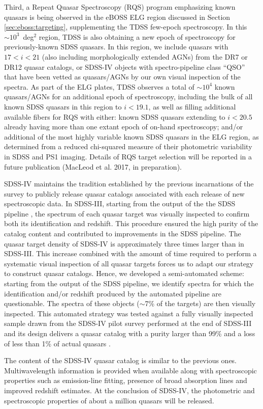 Third, a Repeat Quasar Spectroscopy (RQS) program emphasizing known
quasars is being observed in the eBOSS ELG region discussed in
Section \ref{sec:eboss:targeting}, supplementing the TDSS few-epoch
spectroscopy. In this $\sim10^3$~deg$^2$ region, TDSS is also
obtaining a new epoch of spectroscopy for previously-known SDSS
quasars. In this region, we include quasars with $17<i<21$ (also
including morphologically extended AGNs) from the DR7 or DR12 quasar
catalogs, or SDSS-IV objects with spectro-pipeline class ``QSO'' that
have been vetted as quasars/AGNs by our own visual inspection of the
spectra. As part of the ELG plates, TDSS observes a total of
$\sim10^4$ known quasars/AGNs for an additional epoch of spectroscopy,
including the bulk of all known SDSS quasars in this region to
$i<19.1$, as well as filling additional available fibers for RQS with
either: known SDSS quasars extending to $i<20.5$ already having more
than one extant epoch of on-hand spectroscopy; and/or additional of
the most highly variable known SDSS quasars in the ELG region, as
determined from a reduced chi-squared measure of their photometric
variability in SDSS and PS1 imaging. Details of RQS target selection
will be reported in a future publication (MacLeod et al. 2017, in
preparation).

SDSS-IV maintains the tradition established by the previous
incarnations of the survey to publicly release quasar catalogs
\citep[e.g.,][]{schneider10a,paris14a} associated with each release of
new spectroscopic data.  In SDSS-III, starting from the output of the
the SDSS pipeline \citep{bolton12a}, the spectrum of each quasar
target was visually inspected to confirm both its identification and
redshift.  This procedure ensured the high purity of the catalog
content and contributed to improvements in the SDSS pipeline.  The
quasar target density of SDSS-IV is approximately three times larger
than in SDSS-III. This increase combined with the amount of time
required to perform a systematic visual inspection of all quasar
targets forces us to adapt our strategy to construct quasar catalogs.
Hence, we developed a semi-automated scheme: starting from the output
of the SDSS pipeline, we identify spectra for which the identification
and/or redshift produced by the automated pipeline are
questionable. The spectra of these objects ($\sim$7\% of the targets)
are then visually inspected. This automated strategy was tested
against a fully visually inspected sample drawn from the SDSS-IV pilot
survey performed at the end of SDSS-III and its design delivers a
quasar catalog with a purity larger than 99\% and a loss of less than
1\% of actual quasars \citep[see ][ for more details]{dawson16a}.

The content of the SDSS-IV quasar catalog is similar to the previous
ones. Multiwavelength information is provided when available along
with spectroscopic properties such as emission-line fitting, presence
of broad absorption lines and improved redshift estimates.  At the
conclusion of SDSS-IV, the photometric and spectroscopic properties of
about a million quasars will be released.

